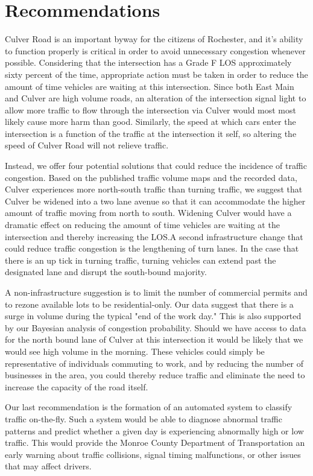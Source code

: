 \documentclass{report}
\begin{document}
\noindent\section*{Recommendations}

Culver Road is an important byway for the citizens of Rochester, and it's ability to function properly is critical in order to avoid unnecessary congestion whenever possible. Considering that the intersection has a Grade F LOS approximately sixty percent of the time, appropriate action must be taken in order to reduce the amount of time vehicles are waiting at this intersection. Since both East Main and Culver are high volume roads, an alteration of the intersection signal light to allow more traffic to flow through the intersection via Culver would most most likely cause more harm than good.
Similarly, the speed at which cars enter the intersection is a function of the traffic at the intersection it self, so altering the speed of Culver Road will not relieve traffic.

Instead, we offer four potential solutions that could reduce the incidence of traffic congestion. Based on the published traffic volume maps and the recorded data, Culver experiences more north-south traffic than turning traffic, we suggest that Culver be widened into a two lane avenue so that it can accommodate the higher amount of traffic moving from north to south. Widening Culver would have a dramatic effect on reducing the amount of time vehicles are waiting at the intersection and thereby increasing the LOS.A second infrastructure change that could reduce traffic congestion is the lengthening of turn lanes. In the case that there is an up tick in turning traffic, turning vehicles can extend past the designated lane and disrupt the south-bound majority.

A non-infrastructure suggestion is to limit the number of commercial permits and to rezone available lots to be residential-only. Our data suggest that there is a surge in volume during the typical "end of the work day." This is also supported by our Bayesian analysis of congestion probability. Should we have access to data for the north bound lane of Culver at this intersection it would be likely that we would see high volume in the morning. These vehicles could simply be representative of individuals commuting to work, and by reducing the number of businesses in the area, you could thereby reduce traffic and eliminate the need to increase the capacity of the road itself.

Our last recommendation is the formation of an automated system to classify traffic on-the-fly. Such a system would be able to diagnose abnormal traffic patterns and predict whether a given day is experiencing abnormally high or low traffic. This would provide the Monroe County Department of Transportation an early warning about traffic collisions, signal timing malfunctions, or other issues that may affect drivers.
\end{document}
